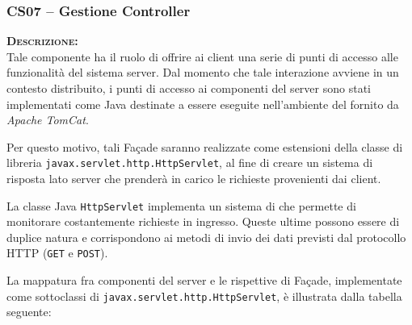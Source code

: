 \subsubsection{CS07 -- Gestione Controller}\label{sec:cs07}
\begin{description}
	\item{\scshape\bfseries Descrizione:}\\
Tale componente ha il ruolo di offrire ai client una serie di punti di accesso alle funzionalità del sistema server. Dal momento che tale interazione avviene in un contesto distribuito, i punti di accesso ai componenti del server sono stati implementati come  Java destinate a essere eseguite nell'ambiente del  fornito da \textit{Apache TomCat}.

Per questo motivo, tali Façade saranno realizzate come estensioni della classe di libreria \texttt{javax.servlet.http.HttpServlet}, al fine di creare un sistema di risposta lato server che prenderà in carico le richieste provenienti dai client.

La classe Java \texttt{HttpServlet} implementa un sistema di  che permette di monitorare costantemente richieste in ingresso. Queste ultime possono essere di duplice natura e corrispondono ai metodi di invio dei dati previsti dal protocollo HTTP (\texttt{GET} e \texttt{POST}).

La mappatura fra componenti del server e le rispettive  di Façade, implementate come sottoclassi di \texttt{javax.servlet.http.HttpServlet}, è illustrata dalla tabella seguente:


\end{description}
